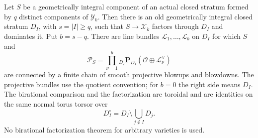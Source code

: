\begin{lemma}
\label{r18rb:strata}
Let $S$ be a geometrically integral component of an actual closed
stratum formed by $q$ distinct components of $\mathcal Y_k$.
Then there is an old geometrically integral closed stratum $D_I$,
with $s=|I|\ge q$, such that $S\to\mathcal X_k$ factors through
$D_I$ and dominates it.  Put $b=s-q$.  There are line bundles
$\mathcal L_1,\ldots,\mathcal L_b$ on $D_I$ for which $S$ and
\[
 \mathcal P_S=
   \prod_{\nu=1}^{b}{}_{D_I}
       \mathbf P_{D_I}(\mathcal O\oplus\mathcal L_\nu^\vee)
 \tag{RB18.2}\label{r18rb:bundle}
\]
are connected by a finite chain of smooth projective blowups and
blowdowns.  The projective bundles use the quotient convention;
for $b=0$ the right side means $D_I$.
The birational comparison and the factorization are toroidal and
are identities on the same normal torus torsor over
\[
 D_I^\circ=D_I\setminus\bigcup_{j\notin I}D_j.
\]
No birational factorization theorem for arbitrary varieties is used.
\end{lemma}

